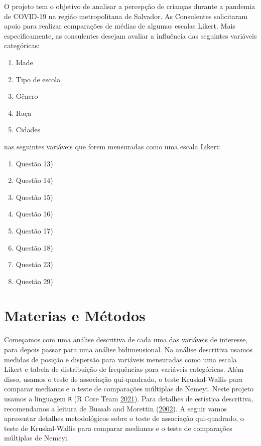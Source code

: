 \documentclass[]{article}
\providecommand{\tightlist}{%
  \setlength{\itemsep}{0pt}\setlength{\parskip}{0pt}}
\begin{document}
O projeto tem o objetivo de analisar a percepção de crianças durante a pandemia de COVID-19 na região metropolitana de Salvador. As Consulentes solicitaram apoio para realizar comparações de médias de algumas escalas Likert. Mais especificamente, as consulentes desejam avaliar a influência das seguintes variáveis categóricas:

\begin{enumerate}
\def\labelenumi{\roman{enumi}.}
\tightlist
\item
  Idade
\item
  Tipo de escola
\item
  Gênero
\item
  Raça
\item
  Cidades
\end{enumerate}

nas seguintes variáveis que forem mensuradas como uma escala Likert:

\begin{enumerate}
\def\labelenumi{\roman{enumi}.}
\tightlist
\item
  Questão 13)
\item
  Questão 14)
\item
  Questão 15)
\item
  Questão 16)
\item
  Questão 17)
\item
  Questão 18)
\item
  Questão 23)
\item
  Questão 29)
\end{enumerate}

\hypertarget{materias-e-muxe9todos}{%
\section{Materias e Métodos}\label{materias-e-muxe9todos}}

Começamos com uma análise descritiva de cada uma das variáveis de interesse, para depois passar para uma análise bidimensional. Na análise descritiva usamos medidas de posição e dispersão para variáveis mensuradas como uma escala Likert e tabela de distribuição de frequências para variáveis categóricas. Além disso, usamos o teste de associação qui-quadrado, o teste Kruskal-Wallis para comparar medianas e o teste de comparações múltiplas de Nemeyi. Neste projeto usamos a linguagem \texttt{R} (R Core Team \protect\hyperlink{ref-Rlang}{2021}). Para detalhes de estística descritiva, recomendamos a leitura de Bussab and Morettin (\protect\hyperlink{ref-bussab2002estatistica}{2002}). A seguir vamos apresentar detalhes metodológicos sobre o teste de associação qui-quadrado, o teste de Kruskal-Wallis para comparar medianas e o teste de comparações múltiplas de Nemeyi.
\end{document}
